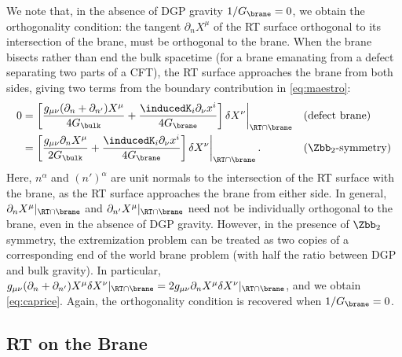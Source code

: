 \rcm{****} We note that, in the absence of DGP gravity $1/G_\brane=0$, we obtain the orthogonality condition: the tangent $\partial_n X^\mu$ of the RT surface orthogonal to its intersection of the brane, must be orthogonal to the brane. When the brane bisects rather than end the bulk spacetime (\eg for a brane emanating from a defect separating two parts of a CFT), the RT surface approaches the brane from both sides, giving two terms from the boundary contribution in \eqref{eq:maestro}:
\begin{align}
  0
  =& \left.
  \left[
  \frac{g_{\mu\nu} (\partial_n + \partial_{n'})X^\mu}{4 G_\bulk}
  + \frac{\inducedK_i \partial_\nu x^i}{4G_\brane}
  \right] \delta X^\nu
  \right|_{\RT\cap\brane}
  & &(\text{defect brane})
  \\
  =& \left.
  \left[
  \frac{g_{\mu\nu} \partial_n X^\mu}{2 G_\bulk}
  + \frac{\inducedK_i \partial_\nu x^i}{4G_\brane}
  \right] \delta X^\nu
  \right|_{\RT\cap\brane}.
  & &(\text{$\Zbb_2$-symmetry})
  \label{eq:caprice}
\end{align}
Here, $n^\alpha$ and $(n')^\alpha$ are unit normals to the intersection of the RT surface with the brane, as the RT surface approaches the brane from either side. In general, $\partial_n X^\mu|_{\RT\cap\brane}$ and $\partial_{n'}X^\mu|_{\RT\cap\brane}$ need not be individually orthogonal to the brane, even in the absence of DGP gravity. However, in the presence of $\Zbb_2$ symmetry, the extremization problem can be treated as two copies of a corresponding end of the world brane problem (with half the ratio between DGP and bulk gravity). In particular, $g_{\mu\nu}(\partial_n+\partial_{n'})X^\mu \delta X^\nu|_{\RT\cap\brane}=2 g_{\mu\nu} \partial_n X^\mu \delta X^\nu|_{\RT\cap\brane}$, and we obtain \eqref{eq:caprice}. Again, the orthogonality condition is recovered when $1/G_\brane=0$.


\subsection{RT on the Brane}\label{sec:genera}

